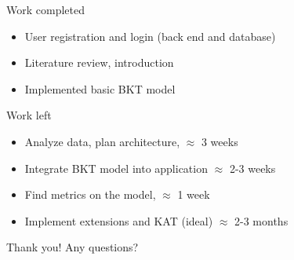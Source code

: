 \documentclass[11pt]{beamer}
\begin{document}
\begin{frame}{Work completed}
	\begin{itemize}
		\item<1-> User registration and login (back end and database)
		\item<2-> Literature review, introduction
		\item<3-> Implemented basic BKT model
	\end{itemize}
\end{frame}

\begin{frame}{Work left}
	\begin{itemize}
		\item<1-> Analyze data, plan architecture, $\approx$ 3 weeks
		\item<2-> Integrate BKT model into application $\approx$ 2-3 weeks
		\item<3-> Find metrics on the model, $\approx$ 1 week
		\item<4-> Implement extensions and KAT (ideal) $\approx$ 2-3 months
	\end{itemize}
\end{frame}

\begin{frame}{Thank you!}
	Any questions?
\end{frame}
\end{document}
